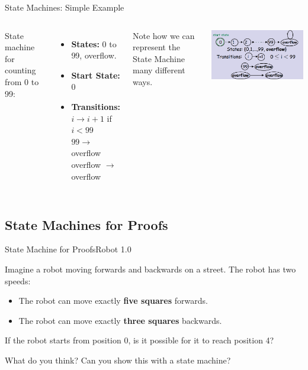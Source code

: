 \begin{frame}[t]{State Machines: Simple Example}

  \begin{columns}
    State machine for counting from 0 to 99:
    \begin{itemize}
      \item {\bf States:} 0 to 99, overflow.
      \item {\bf Start State:} 0
      \item {\bf Transitions:}\\
        $i \to i+1$ if $i < 99$\\
        $99 \to$ overflow\\
        overflow $\to$ overflow\\
    \end{itemize}\bigskip

    Note how we can represent the State Machine many different ways.

    \includegraphics[width=1\textwidth]{../img/statemachine}
  \end{columns}
\end{frame}

\subsection{State Machines for Proofs}
\begin{frame}[t]{State Machine for Proofs}{Robot 1.0}

  Imagine a robot moving forwards and backwards on a street. The robot has two speeds:
  \begin{itemize}
    \item The robot can move exactly {\bf five squares} forwards.
    \item The robot can move exactly {\bf three squares} backwards.
  \end{itemize}
  \bigskip

  If the robot starts from position 0, is it possible for it to reach position 4?
  \vfill

  What do you think? Can you show this with a state machine?
\end{frame}

